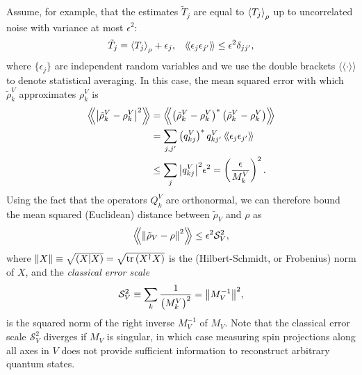 \documentclass[notitlepage,twocolumn]{revtex4-2}
\newcommand{\f}[2]{\dfrac{#1}{#2}} %
\newcommand{\p}[1]{\left(#1\right)} %
\newcommand{\bk}{\Braket} %
\renewcommand{\set}[1]{\{#1\}} %
\newcommand{\bbk}[1]{\langle\!\langle #1 \rangle\!\rangle}
\newcommand{\Bbk}[1]
{\left\langle\!\!\left\langle #1 \right\rangle\!\!\right\rangle}
\renewcommand{\S}{\mathcal{S}}
\def\obk#1{\mathinner{({#1})}}
\begin{document}
Assume, for example, that the estimates $\tilde T_j$ are equal to $\bk{T_j}_\rho$ up to uncorrelated noise with variance at most $\epsilon^2$:
\begin{align}
  \tilde T_j = \bk{T_j}_\rho + \epsilon_j,
  &&
  \bbk{\epsilon_j \epsilon_{j'}} \le \epsilon^2 \delta_{jj'},
  \label{eq:error_assumption}
\end{align}
where $\set{\epsilon_j}$ are independent random variables and we use the double brackets $\bbk{\cdot}$ to denote statistical averaging.
In this case, the mean squared error with which $\tilde\rho^V_k$ approximates $\rho^V_k$ is
\begin{align}
  \Bbk{\abs{\tilde\rho^V_k-\rho^V_k}^2}
  &= \Bbk{\p{\tilde\rho^V_k-\rho^V_k}^*\p{\tilde\rho^V_k-\rho^V_k}} \\
  &= \sum_{j,j'} \p{q^V_{kj}}^* q^V_{kj'}\,
  \bbk{\epsilon_j \epsilon_{j'}} \\
  &\le \sum_j \abs{q^V_{kj}}^2 \epsilon^2
  = \p{\f{\epsilon}{M^V_k}}^2.
\end{align}
Using the fact that the operators $Q^V_k$ are orthonormal, we can therefore bound the mean squared (Euclidean) distance between $\tilde\rho_V$ and $\rho$ as
\begin{align}
  \Bbk{\norm{\tilde\rho_V-\rho}^2}
  \le \epsilon^2 \S_V^2,
  \label{eq:bound_eps}
\end{align}
where $\norm{X} \equiv \sqrt{\obk{X|X}} = \sqrt{\tr\p{X^\dag X}}$ is the (Hilbert-Schmidt, or Frobenius) norm of $X$, and the {\it classical error scale}
\begin{align}
  \S_V^2 \equiv \sum_k\f1{\p{M^V_k}^2} = \norm{M_V^{-1}}^2,
\end{align}
is the squared norm of the right inverse $M_V^{-1}$ of $M_V$.
Note that the classical error scale $\S_V^2$ diverges if $M_V$ is singular, in which case measuring spin projections along all axes in $V$ does not provide sufficient information to reconstruct arbitrary quantum states.
\end{document}
